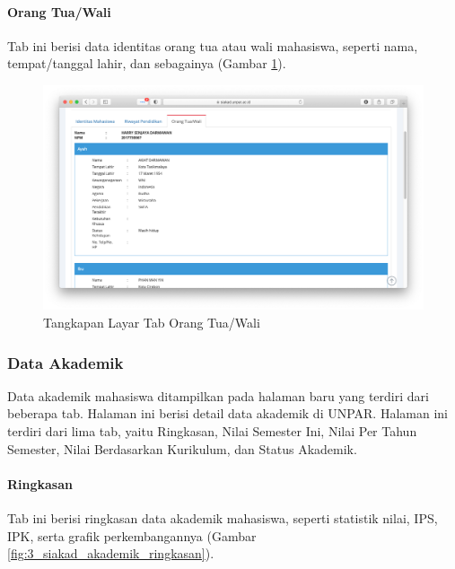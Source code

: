 \paragraph{Orang Tua/Wali} Tab ini berisi data identitas orang tua atau wali mahasiswa, seperti nama, tempat/tanggal lahir, dan sebagainya (Gambar \ref{fig:3_siakad_datadiri_orangtuawali}).

\begin{figure}[H]
    \centering
    \includegraphics[scale=0.35]{Gambar/siakad_datadiri_orangtuawali.png}
    \caption{Tangkapan Layar Tab Orang Tua/Wali}
    \label{fig:3_siakad_datadiri_orangtuawali}
\end{figure}

\subsubsection{Data Akademik}

Data akademik mahasiswa ditampilkan pada halaman baru yang terdiri dari beberapa tab. Halaman ini berisi detail data akademik di UNPAR. Halaman ini terdiri dari lima tab, yaitu Ringkasan, Nilai Semester Ini, Nilai Per Tahun Semester, Nilai Berdasarkan Kurikulum, dan Status Akademik.

\paragraph{Ringkasan} Tab ini berisi ringkasan data akademik mahasiswa, seperti statistik nilai, IPS, IPK, serta grafik perkembangannya (Gambar \ref{fig:3_siakad_akademik_ringkasan}).

